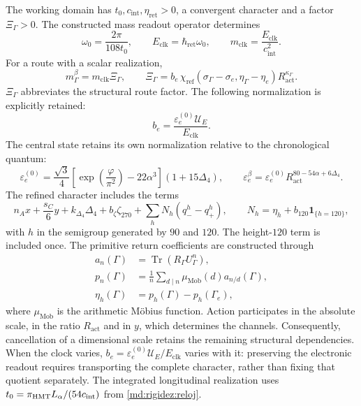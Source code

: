 The working domain has $t_0,c_{\mathrm{int}},\eta_{\mathrm{ret}}>0$, a
convergent character and a factor $\Xi_\Gamma>0$. The constructed mass
readout operator determines
\begin{equation}
 \omega_0=\frac{2\pi}{108t_0},\qquad
 E_{\mathrm{clk}}=\hbar_{\mathrm{ret}}\omega_0,\qquad
 m_{\mathrm{clk}}=\frac{E_{\mathrm{clk}}}{c_{\mathrm{int}}^2}.
 \label{md:hib:reloj}
\end{equation}
For a route with a scalar realization,
\begin{equation}
 m_\Gamma^\beta=m_{\mathrm{clk}}\Xi_\Gamma,\qquad
 \Xi_\Gamma=b_e\,
 \chi_{\mathrm{ref}}(\sigma_\Gamma-\sigma_e,\eta_\Gamma-\eta_e)
 R_{\mathrm{act}}^{\kappa_\Gamma}.
 \label{md:hib:factor-ruta}
\end{equation}
$\Xi_\Gamma$ abbreviates the structural route factor. The following
normalization is explicitly retained:
\begin{equation}
 b_e=\frac{\varepsilon_e^{(0)}\mathcal U_E}{E_{\mathrm{clk}}}.
 \label{md:hib:normalizacion-electron}
\end{equation}
The central state retains its own normalization relative to the
chronological quantum:
\begin{equation}
 \varepsilon_e^{(0)}=\frac{\sqrt3}{4}
 \left[\exp\!\left(\frac{\varphi}{\pi^2}\right)-22\alpha^3\right]
 (1+15\Delta_4),\qquad
 \varepsilon_e^\beta=\varepsilon_e^{(0)}
 R_{\mathrm{act}}^{80-54\alpha+6\Delta_4}.
 \label{md:hib:electron}
\end{equation}
The refined character includes the terms
\begin{equation}
 n_Ax+\frac{s_C}{6}y+k_{\Delta_4}\Delta_4+b_\zeta\zeta_{270}
 +\sum_h N_h(q_-^h-q_+^h),\qquad
 N_h=\eta_h+b_{120}\mathbf 1_{\{h=120\}},
 \label{md:hib:caracter}
\end{equation}
with $h$ in the semigroup generated by $90$ and $120$. The height-$120$
term is included once. The primitive return coefficients are constructed
through
\begin{equation}
 \begin{aligned}
 a_n(\Gamma)&=\operatorname{Tr}(R_\Gamma U_\Gamma^n),\\
 p_n(\Gamma)&=\frac1n\sum_{d\mid n}\mu_{\mathrm{Mob}}(d)
                         a_{n/d}(\Gamma),\\
 \eta_h(\Gamma)&=p_h(\Gamma)-p_h(\Gamma_e),
 \end{aligned}
 \label{md:hib:retornos-primitivos}
\end{equation}
where $\mu_{\mathrm{Mob}}$ is the arithmetic Möbius function.
Action participates in the absolute scale, in the ratio $R_{\mathrm{act}}$
and in $y$, which determines the channels. Consequently, cancellation of
a dimensional scale retains the remaining structural dependencies.
When the clock varies, $b_e=\varepsilon_e^{(0)}\mathcal U_E/E_{\mathrm{clk}}$
varies with it: preserving the electronic readout requires transporting
the complete character, rather than fixing that quotient separately.
The integrated longitudinal realization uses
$t_0=\pi_{\rm HMT}L_\alpha/(54c_{\mathrm{int}})$ from
\eqref{md:rigidez:reloj}.

